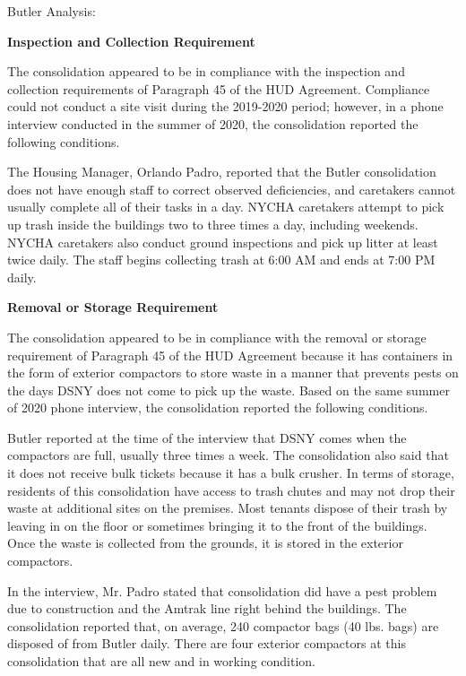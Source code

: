 Butler Analysis: 

\textbf{Inspection and Collection Requirement} 

 

The consolidation appeared to be in compliance with the inspection and collection requirements of Paragraph 45 of the HUD Agreement. Compliance could not conduct a site visit during the 2019-2020 period; however, in a phone interview conducted in the summer of 2020, the consolidation reported the following conditions.

The Housing Manager, Orlando Padro, reported that the Butler consolidation does not have enough staff to correct observed deficiencies, and caretakers cannot usually complete all of their tasks in a day. NYCHA caretakers attempt to pick up trash inside the buildings two to three times a day, including weekends. NYCHA caretakers also conduct ground inspections and pick up litter at least twice daily. The staff begins collecting trash at 6:00 AM and ends at 7:00 PM daily. 

\textbf{Removal or Storage Requirement} 

The consolidation appeared to be in compliance with the removal or storage requirement of Paragraph  45 of the HUD Agreement because it has containers in the form of exterior compactors to store waste in a manner that prevents pests on the days DSNY does not come to pick up the waste. Based on the same summer of  2020  phone interview, the consolidation reported the following conditions.

 

Butler reported at the time of the interview that DSNY comes when the compactors are full, usually three times a week. The consolidation also said that it does not receive bulk tickets because it has a bulk crusher.  In terms of storage, residents of this consolidation have access to trash chutes and may not drop their waste at additional sites on the premises. Most tenants dispose of their trash by leaving in on the floor or sometimes bringing it to the front of the buildings. Once the waste is collected from the grounds, it is stored in the exterior compactors.

 

In the interview, Mr. Padro stated that consolidation did have a pest problem due to construction and the Amtrak line right behind the buildings. The consolidation reported that, on average, 240 compactor bags (40 lbs. bags)  are disposed of from Butler daily.  There are four exterior compactors at this consolidation that are all new and in working condition. 

